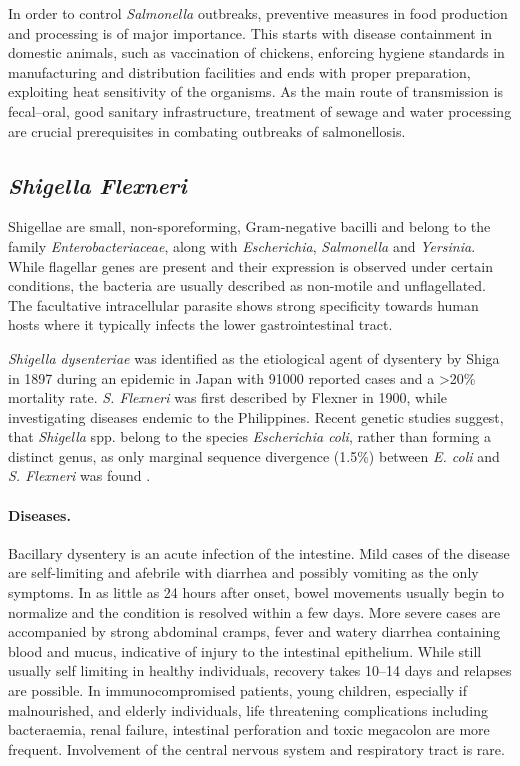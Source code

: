 In order to control \textit{Salmonella} outbreaks, preventive measures in food production and processing is of major importance. This starts with disease containment in domestic animals, such as vaccination of chickens, enforcing  hygiene standards in manufacturing and distribution facilities and ends with proper preparation, exploiting heat sensitivity of the organisms. As the main route of transmission is fecal--oral, good sanitary infrastructure, treatment of sewage and water processing are crucial prerequisites in combating outbreaks of salmonellosis.

\subsection{\textit{Shigella Flexneri}}
Shigellae are small, non-sporeforming, Gram-negative bacilli and belong to the family \textit{Enterobacteriaceae}, along with \textit{Escherichia}, \textit{Salmonella} and \textit{Yersinia}. While flagellar genes are present and their expression is observed under certain conditions, the bacteria are usually described as non-motile and unflagellated. The facultative intracellular parasite shows strong specificity towards human hosts where it typically infects the lower gastrointestinal tract.

\textit{Shigella dysenteriae} was identified as the etiological agent of dysentery by Shiga in 1897 during an epidemic in Japan with 91000 reported cases and a \textgreater 20\% mortality rate. \textit{S. Flexneri} was first described by Flexner in 1900, while investigating diseases endemic to the Philippines. Recent genetic studies suggest, that \textit{Shigella} spp. belong to the species \textit{Escherichia coli}, rather than forming a distinct genus, as only marginal sequence divergence (1.5\%) between \textit{E. coli} and \textit{S. Flexneri} was found \citep{Schroeder2008}.

\paragraph{Diseases.}
Bacillary dysentery is an acute infection of the intestine. Mild cases of the disease are self-limiting and afebrile with diarrhea and possibly vomiting as the only symptoms. In as little as 24 hours after onset, bowel movements usually begin to normalize and the condition is resolved within a few days. More severe cases are accompanied by strong abdominal cramps, fever and watery diarrhea containing blood and mucus, indicative of injury to the intestinal epithelium. While still usually self limiting in healthy individuals, recovery takes 10--14 days and relapses are possible. In immunocompromised patients, young children, especially if malnourished, and elderly individuals, life threatening complications including bacteraemia, renal failure, intestinal perforation and toxic megacolon are more frequent. Involvement of the central nervous system and respiratory tract is rare.


